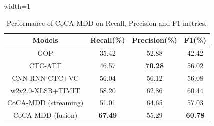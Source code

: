 \documentclass[a4paper]{article}
\begin{document}
\begin{table}[tb]
\centering
\caption{Performance of CoCA-MDD on Recall, Precision and F1 metrics.}
\vspace{-2mm}
\setlength{\tabcolsep}{3pt}
\begin{adjustbox}{width=1\linewidth}
\begin{tabular}{c|ccc}
\hline
Models              & Recall(\%) & Precision(\%) & F1(\%) \\ \hline
GOP \cite{Yan2021EndtoEndMD}                 & 35.42         & 52.88      & 42.42         \\ %
CTC-ATT \cite{yan2020end}             & 46.57         & \textbf{70.28}      & 56.02         \\ %
CNN-RNN-CTC+VC \cite{fu2021full}      & 56.04         & 56.12      & 56.08         \\ %
w2v2.0-XLSR+TIMIT \cite{peng2021study} & 58.20         & 62.86      & 60.44         \\
\hline
CoCA-MDD (streaming)                 & 51.01         & 64.65      & 57.03         \\ %
CoCA-MDD (fusion)        & \textbf{67.49}         & 55.29      & \textbf{60.78} \\ \hline
\end{tabular}
\end{adjustbox}
\label{tab:t2}
\vspace{-3mm}
\end{table}
\end{document}
